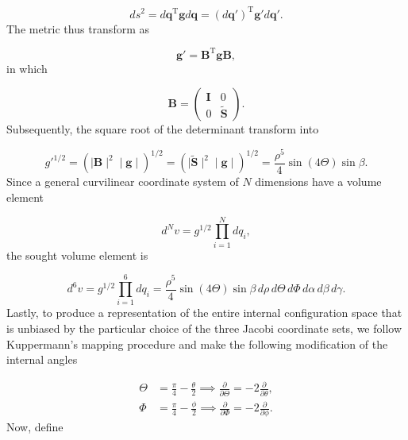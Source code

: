 \begin{equation}
d s^2 = d \mathbf{q}^{\mathrm{T}}\mathbf{g}d \mathbf{q} = (d \mathbf{q}')^\mathrm{T}\mathbf{g}'d\mathbf{q}'.
\end{equation}
The metric thus transform as 

\begin{equation}
\mathbf{g}'=\mathbf{B}^{\mathrm{T}}\mathbf{g}\mathbf{B},
\end{equation}
in which

\begin{equation}
\mathbf{B} = 
\begin{pmatrix}
\mathbf{I} & 0\\
0      & \tilde{\mathbf{S}}
\end{pmatrix}.
\end{equation}
Subsequently, the square root of the determinant transform into

\begin{equation}
g'^{1/2}=(\mid\mathbf{B}\mid^2 \mid\mathbf{g}\mid)^{1/2} = (\mid\tilde{\mathbf{S}}\mid^2 \mid\mathbf{g}\mid)^{1/2}
= \frac{\rho^5}{4}\sin(4\Theta)\sin\beta.
\end{equation}
Since a general curvilinear coordinate system of $N$ dimensions have a volume element

\begin{equation}
d ^Nv = g^{1/2}\prod_{i=1}^{N} d q_i,
\end{equation}
the sought volume element is  

\begin{equation}
d^6v = g^{1/2}\prod_{i=1}^{6} d q_i = \frac{\rho^5}{4}\sin(4\Theta)\sin\beta \,d\rho \,d\Theta \, d\Phi \, d\alpha \,d\beta \,d\gamma.
\end{equation}
Lastly, to produce a representation of the entire internal configuration
space that is unbiased by the particular choice of the three Jacobi coordinate sets, we follow Kuppermann's mapping procedure \cite{KUPPERMANN1975374} and make the following modification of the internal angles

\begin{equation}
\begin{aligned}
\Theta &= \frac{\pi}{4}-\frac{\theta}{2} \implies \frac{\partial}{\partial\Theta} = -2\frac{\partial}{\partial\theta},\\
\Phi &= \frac{\pi}{4}-\frac{\phi}{2} \implies \frac{\partial}{\partial\Phi} = -2\frac{\partial}{\partial\phi}.
\end{aligned}
\end{equation}
Now, define

